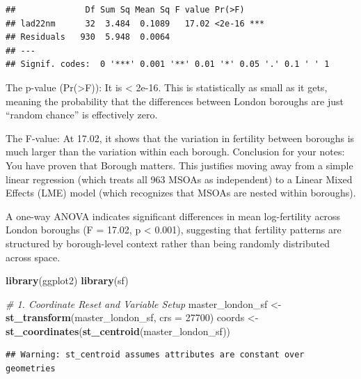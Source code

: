 \documentclass[
]{article}
\newenvironment{Shaded}{\begin{snugshade}}{\end{snugshade}}
\newcommand{\AttributeTok}[1]{\textcolor[rgb]{0.13,0.29,0.53}{#1}}
\newcommand{\CommentTok}[1]{\textcolor[rgb]{0.56,0.35,0.01}{\textit{#1}}}
\newcommand{\DecValTok}[1]{\textcolor[rgb]{0.00,0.00,0.81}{#1}}
\newcommand{\FunctionTok}[1]{\textcolor[rgb]{0.13,0.29,0.53}{\textbf{#1}}}
\newcommand{\NormalTok}[1]{#1}
\newcommand{\OtherTok}[1]{\textcolor[rgb]{0.56,0.35,0.01}{#1}}
\begin{document}
\begin{verbatim}
##              Df Sum Sq Mean Sq F value Pr(>F)    
## lad22nm      32  3.484  0.1089   17.02 <2e-16 ***
## Residuals   930  5.948  0.0064                   
## ---
## Signif. codes:  0 '***' 0.001 '**' 0.01 '*' 0.05 '.' 0.1 ' ' 1
\end{verbatim}

The p-value (Pr(\textgreater F)): It is \textless{} 2e-16. This is
statistically as small as it gets, meaning the probability that the
differences between London boroughs are just ``random chance'' is
effectively zero.

The F-value: At 17.02, it shows that the variation in fertility between
boroughs is much larger than the variation within each borough.
Conclusion for your notes: You have proven that Borough matters. This
justifies moving away from a simple linear regression (which treats all
963 MSOAs as independent) to a Linear Mixed Effects (LME) model (which
recognizes that MSOAs are nested within boroughs).

A one-way ANOVA indicates significant differences in mean log-fertility
across London boroughs (F = 17.02, p \textless{} 0.001), suggesting that
fertility patterns are structured by borough-level context rather than
being randomly distributed across space.

\begin{Shaded}
\begin{Highlighting}[]
\FunctionTok{library}\NormalTok{(ggplot2)}
\FunctionTok{library}\NormalTok{(sf)}

\CommentTok{\# 1. Coordinate Reset and Variable Setup}
\NormalTok{master\_london\_sf }\OtherTok{\textless{}{-}} \FunctionTok{st\_transform}\NormalTok{(master\_london\_sf, }\AttributeTok{crs =} \DecValTok{27700}\NormalTok{)}
\NormalTok{coords }\OtherTok{\textless{}{-}} \FunctionTok{st\_coordinates}\NormalTok{(}\FunctionTok{st\_centroid}\NormalTok{(master\_london\_sf))}
\end{Highlighting}
\end{Shaded}

\begin{verbatim}
## Warning: st_centroid assumes attributes are constant over geometries
\end{verbatim}
\end{document}
